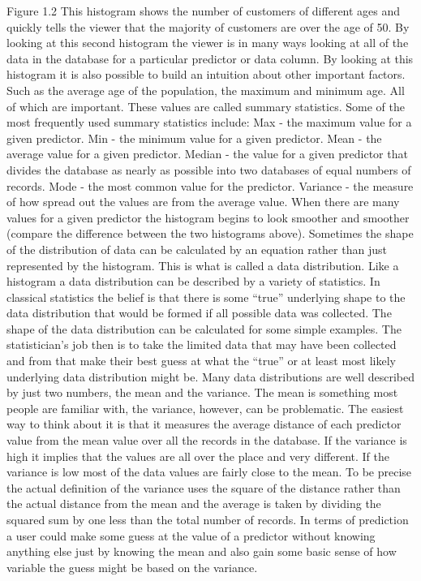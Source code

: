 Figure 1.2  This histogram shows the number of customers of different ages and quickly tells the viewer that the majority of customers are over the age of 50.
By looking at this second histogram the viewer is in many ways looking at all of the data in the database for a particular predictor or data column.  By looking at this histogram it is also possible to build an intuition about other important factors.  Such as the average age of the population, the maximum and minimum age.  All of which are important.  These values are called summary statistics.  Some of the most frequently used summary statistics include:
Max - the maximum value for a given predictor. 
Min - the minimum value for a given predictor. 
Mean - the average value for a given predictor. 
Median - the value for a given predictor that divides the database as nearly as possible into two databases of equal numbers of records. 
Mode - the most common value for the predictor. 
Variance - the measure of how spread out the values are from the average value. 
When there are many values for a given predictor the histogram begins to look smoother and smoother (compare the difference between the two histograms above).  Sometimes the shape of the distribution of data can be calculated by an equation rather than just represented by the histogram.  This is what is called a data distribution.  Like a histogram a data distribution can be described by a variety of statistics.  In classical statistics the belief is that there is some “true” underlying shape to the data distribution that would be formed if all possible data was collected.  The shape of the data distribution can be calculated for some simple examples. The statistician’s job then is to take the limited data that may have been collected and from that make their best guess at what the “true” or at least most likely underlying data distribution might be.
Many data distributions are well described by just two numbers, the mean and the variance.  The mean is something most people are familiar with, the variance, however, can be problematic.  The easiest way to think about it is that it measures the average distance of each predictor value from the mean value over all the records in the database.  If the variance is high it implies that the values are all over the place and very different.  If the variance is low most of the data values are fairly close to the mean.  To be precise the actual definition of the variance uses the square of the distance rather than the actual distance from the mean and the average is taken by dividing the squared sum by one less than the total number of records.  In terms of prediction a user could make some guess at the value of a predictor without knowing anything else just by knowing the mean and also gain some basic sense of how variable the guess might be based on the variance.
